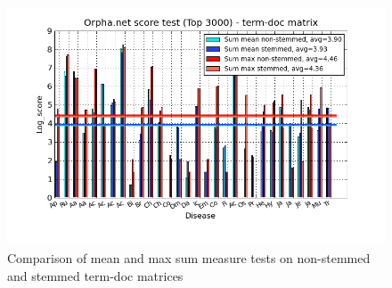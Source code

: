 \begin{figure}[H]
  \caption{Comparison of mean and max sum measure tests on non-stemmed and stemmed term-doc matrices}
  \begin{center}
    \includegraphics[width=1.2\textwidth]{barcharts/termDoc_orphan_hist_3000_ns_s_mea_max_sum.png}
  \end{center}
  \label{termDoc_orphan_hist_3000_ns_s_mea_max_sum}
\end{figure} 

